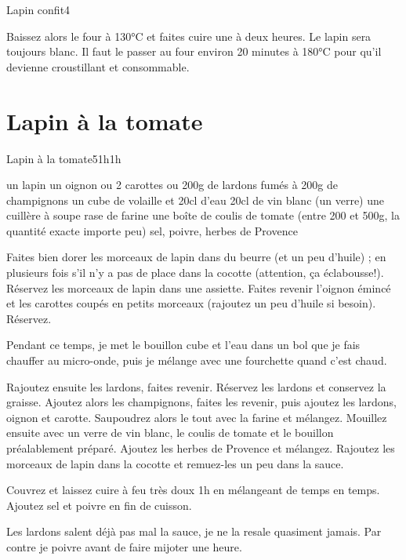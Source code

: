 {\begin{recette}{Lapin confit}{4}{}{}
\begin{cuisson}
Baissez alors le four à 130°C et faites cuire une à deux heures. Le lapin sera toujours blanc. Il faut le passer au four environ 20 minutes à 180°C pour qu'il devienne croustillant et consommable.
\end{cuisson}
\end{recette}

\section{Lapin à la tomate}
\begin{recette}{Lapin à la tomate}{5}{1h}{1h}
\begin{ingredients}[4 pers.]
\ingredient un lapin
\ingredient un oignon
 ou 2 carottes
 ou 200g de lardons fumés
 à 200g de champignons
\ingredient un cube de volaille et 20cl d'eau
\ingredient 20cl de vin blanc (un verre)
\ingredient une cuillère à soupe rase de farine
\ingredient une boîte de coulis de tomate (entre 200 et 500g, la quantité exacte importe peu)
\ingredient sel, poivre, herbes de Provence
\end{ingredients}

\begin{preparation}
\etape Faites bien dorer les morceaux de lapin dans du beurre (et un peu d'huile) ; en plusieurs fois s'il n'y a pas de place 
dans la cocotte (attention, ça éclabousse!).
\etape Réservez les morceaux de lapin dans une assiette.
\etape Faites revenir l'oignon émincé et les carottes coupés en petits morceaux (rajoutez un peu d'huile si besoin). Réservez.
\begin{remarque}
Pendant ce temps, je met le bouillon cube et l'eau dans un bol que je fais chauffer au micro-onde, puis je mélange avec une 
fourchette quand c'est chaud.
\end{remarque}
\etape Rajoutez ensuite les lardons, faites revenir. Réservez les lardons et conservez la graisse. 
\etape Ajoutez alors les champignons, faites les revenir, puis ajoutez les lardons, oignon et carotte.
\etape Saupoudrez alors le tout avec la farine et mélangez. 
\etape Mouillez ensuite avec un verre de vin blanc, le coulis de tomate et le bouillon préalablement préparé. Ajoutez les herbes 
de Provence et mélangez.
\etape Rajoutez les morceaux de lapin dans la cocotte et remuez-les un peu dans la sauce.
\end{preparation}

\begin{cuisson}
Couvrez et laissez cuire à feu très doux 1h en mélangeant de temps en temps. Ajoutez sel et poivre en fin de cuisson.
\begin{remarque}
Les lardons salent déjà pas mal la sauce, je ne la resale quasiment jamais. Par contre je poivre avant de faire mijoter une 
heure.
\end{remarque}
\end{cuisson}
\end{recette}

}
